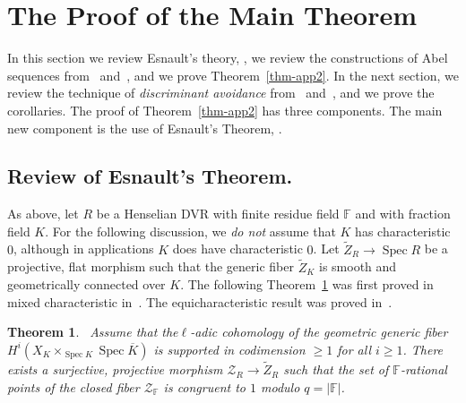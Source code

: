 \documentclass[11pt]{article}
\newtheorem{theo}{Theorem}[section]
\theoremstyle{definition}
\numberwithin{equation}{section}
\numberwithin{figure}{section}
\numberwithin{table}{section}
\newcommand{\mbb}{\mathbb}
\newcommand{\FF}{\mbb{F}}
\newcommand{\mc}{\mathcal}
\newcommand{\mcZ}{\mc{Z}}
\newcommand{\wt}{\widetilde}
\newcommand{\ol}{\overline}
\newcommand{\Rr}{R}
\newcommand{\FR}{K}
\DeclareMathOperator{\SP}{Spec}
\begin{document}
\section{The Proof of the Main Theorem}\label{sec-proof}

In this section we review Esnault's theory, \cite{Esnaultpadic}, we review the constructions of Abel sequences from~\cite{dJHS} and~\cite{Zhu}, and we prove Theorem~\ref{thm-app2}. In the next section, we review the technique of \emph{discriminant avoidance} from~\cite{dJS8} and~\cite[Section~16]{dJHS}, and we prove the corollaries. The proof of Theorem~\ref{thm-app2} has three components. The main new component is the use of Esnault's Theorem, \cite[Corollary~1.2]{Esnaultpadic}.

\subsection{Review of Esnault's Theorem.} \label{subsec-rev}
As above, let $\Rr$ be a Henselian DVR with finite residue field $\FF$ and with fraction field $\FR$. For the following discussion, we \emph{do not} assume that $\FR$ has characteristic $0$, although in applications $\FR$ does have characteristic $0$. Let $\wt{Z}_\Rr \to \SP \Rr$ be a projective, flat morphism such that the generic fiber $\wt{Z}_\FR$ is smooth and geometrically connected over $\FR$. The following Theorem~\ref{thm-Esnault} was first proved in mixed characteristic in~\cite{Esnaultpadic}. The equicharacteristic result was proved in~\cite{EsnaultXu}.

\begin{theo}
{\cite[Theorem~1.1]{Esnaultpadic}~\cite[Theorem~1.1]{EsnaultXu}}\label{thm-Esnault}
Assume that the\linebreak$\ell$-adic cohomology of the geometric generic fiber $H^i(X_\FR \times_{\SP \FR} \SP \ol{\FR})$ is supported in codimension $\geq 1$ for all $i\geq 1$. There exists a surjective, projective morphism $\mcZ_\Rr \to \wt{Z}_\Rr$ such that the set of $\FF$-rational points of the closed fiber $\mcZ_\FF$ is congruent to $1$ modulo $q=|\FF|$.
\end{theo}
\end{document}
